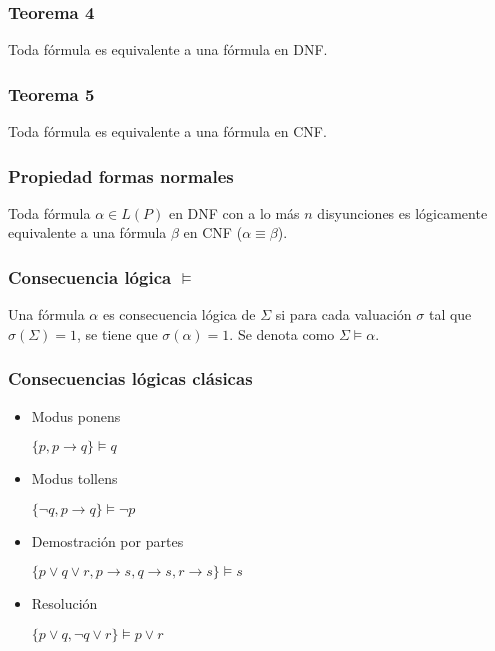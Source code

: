 \begin{multicols}{2}
    \subsubsection*{Teorema 4}
    Toda fórmula es equivalente a una fórmula en DNF.
    
    \subsubsection*{Teorema 5}
    Toda fórmula es equivalente a una fórmula en CNF.
    
    \subsubsection*{Propiedad formas normales}
    Toda fórmula $\alpha \in L(P)$ en DNF con a lo más $n$ disyunciones es lógicamente equivalente a una fórmula $\beta$ en CNF ($\alpha \equiv \beta$).
    
    \subsubsection*{Consecuencia lógica $\models$}
    Una fórmula $\alpha$ es consecuencia lógica de $\Sigma$ si para cada valuación $\sigma$ tal que $\sigma(\Sigma) = 1$, se tiene que $\sigma(\alpha) =  1$. Se denota como $\Sigma \models \alpha$.
    
    \subsubsection*{Consecuencias lógicas clásicas}
        \begin{itemize}
            \item Modus ponens
    
                  $\{p, p \rightarrow q\} \models q$
    
            \item Modus tollens
    
                  $\{\neg q, p \rightarrow q\} \models \neg p$
    
            \item Demostración por partes
    
                  $\{p \vee q \vee r, p \rightarrow s, q \rightarrow s, r \rightarrow s\} \models s$
    
            \item Resolución
    
                  $\{p \vee q, \neg q \vee r\} \models p \vee r$
        \end{itemize}
    

\end{multicols}
